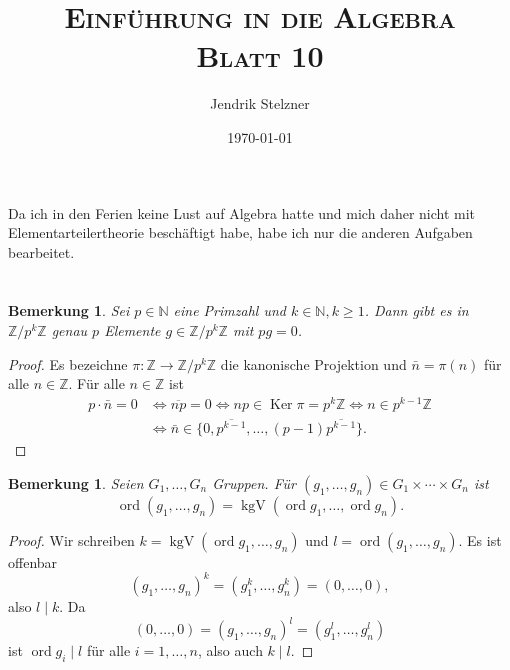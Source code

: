 \documentclass[a4paper,10pt]{article}
\title{\textsc{Einführung in die Algebra \\ \Large Blatt 10}}
\author{Jendrik Stelzner}
\date{\today}
\newcounter{satze}
\newtheorem{bem}[satze]{Bemerkung}
\theoremstyle{definition}
\newcommand{\N}{\mathbb{N}}
\newcommand{\Z}{\mathbb{Z}}
\newcommand{\ord}{\operatorname{ord}}
\newcommand{\kgV}{\operatorname{kgV}}
\newcommand{\Ker}{\operatorname{Ker}}
\begin{document}
\maketitle





\section{}
Da ich in den Ferien keine Lust auf Algebra hatte und mich daher nicht mit Elementarteilertheorie beschäftigt habe, habe ich nur die anderen Aufgaben bearbeitet.





\section{}


\begin{bem}\label{bem: elemente der ordnung p}
 Sei $p \in \N$ eine Primzahl und $k \in \N, k \geq 1$. Dann gibt es in $\Z/p^k\Z$ genau $p$ Elemente $g \in \Z/p^k\Z$ mit $pg = 0$.
\end{bem}
\begin{proof}
 Es bezeichne $\pi : \Z \rightarrow \Z/p^k\Z$ die kanonische Projektion und $\bar{n} = \pi(n)$ für alle $n \in \Z$. Für alle $n \in \Z$ ist
 \begin{align*}
  p \cdot \bar{n} = 0
  &\Leftrightarrow \overline{np} = 0
  \Leftrightarrow np \in \Ker \pi = p^k\Z
  \Leftrightarrow n \in p^{k-1}\Z \\
  &\Leftrightarrow \bar{n} \in \{0,\overline{p^{k-1}},\ldots,(p-1)\overline{p^{k-1}}\}.
 \end{align*}
\end{proof}


\begin{bem}\label{bem: Ordnung im Produkt}
 Seien $G_1, \ldots, G_n$ Gruppen. Für $(g_1, \ldots, g_n) \in G_1 \times \cdots \times G_n$ ist
 \[
  \ord (g_1, \ldots, g_n) = \kgV(\ord g_1, \ldots, \ord g_n).
 \]
\end{bem}
\begin{proof}
 Wir schreiben $k = \kgV(\ord g_1, \ldots, g_n)$ und $l = \ord (g_1, \ldots, g_n)$. Es ist offenbar
 \[
  (g_1, \ldots, g_n)^k = (g_1^k, \ldots, g_n^k) = (0, \ldots, 0),
 \]
 also $l \mid k$. Da
 \[
  (0, \ldots, 0) = (g_1, \ldots, g_n)^l = (g_1^l, \ldots, g_n^l)
 \]
 ist $\ord g_i \mid l$ für alle $i = 1, \ldots, n$, also auch $k \mid l$.
\end{proof}
\end{document}
